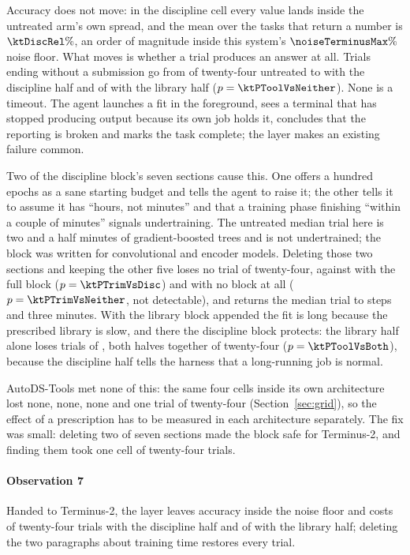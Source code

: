 

Accuracy does not move: in the discipline cell every value lands inside the
untreated arm's own spread, and the mean over the \ktDiscTasks{} tasks that
return a number is $\ktDiscRel\%$, an order of magnitude inside this system's
$\noiseTerminusMax\%$ noise floor. What moves is whether a trial produces an
answer at all. Trials ending without a submission go from \ktNeitherLost{} of
twenty-four untreated to \ktDiscLost{} with the discipline half and
\ktToolLost{} of \ktToolTrials{} with the library half
($p=\ktPToolVsNeither$). None is a timeout. The agent launches a fit in the
foreground, sees a terminal that has stopped producing output because its own
job holds it, concludes that the reporting is broken and marks the task
complete; the layer makes an existing failure common.

Two of the discipline block's seven sections cause this. One offers a hundred
epochs as a sane starting budget and tells the agent to raise it; the other
tells it to assume it has ``hours, not minutes'' and that a training phase
finishing ``within a couple of minutes'' signals undertraining. The untreated
median trial here is two and a half minutes of gradient-boosted trees and is
not undertrained; the block was written for convolutional and encoder models.
Deleting those two sections and keeping the other five loses no trial of
twenty-four, against \ktDiscLost{} with the full block ($p=\ktPTrimVsDisc$)
and \ktNeitherLost{} with no block at all ($p=\ktPTrimVsNeither$, not
detectable), and returns the median trial to \ktTrimSteps{} steps and three
minutes. With the library block appended the fit is long because the
prescribed library is slow, and there the discipline block protects: the
library half alone loses \ktToolLost{} trials of \ktToolTrials{}, both halves
together \ktBothLost{} of twenty-four ($p=\ktPToolVsBoth$), because the
discipline half tells the harness that a long-running job is normal.

AutoDS-Tools met none of this: the same four cells inside its own
architecture lost none, none, none and one trial of twenty-four
(Section~\ref{sec:grid}), so the effect of a prescription has to be measured
in each architecture separately. The fix was small: deleting two of seven
sections made the block safe for Terminus-2, and finding them took one cell
of twenty-four trials.

\paragraph{Observation 7} Handed to Terminus-2, the layer leaves accuracy
inside the noise floor and costs \ktDiscLost{} of twenty-four trials with the
discipline half and \ktToolLost{} of \ktToolTrials{} with the library half;
deleting the two paragraphs about training time restores every trial.
